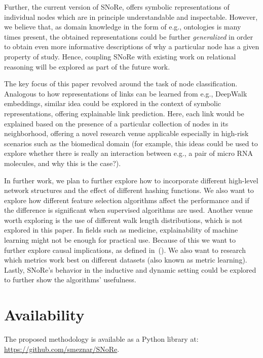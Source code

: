 \documentclass[twoside,11pt]{article}
\begin{document}
Further, the current version of SNoRe, offers symbolic representations of individual nodes which are in principle understandable and inspectable. However, we believe that, as domain knowledge in the form of e.g., ontologies is many times present, the obtained representations could be further \emph{generalized} in order to obtain even more informative descriptions of why a particular node has a given property of study. Hence, coupling SNoRe with existing work on relational reasoning will be explored as part of the future work.

The key focus of this paper revolved around the task of node classification. Analogous to how representations of links can be learned from e.g., DeepWalk embeddings, similar idea could be explored in the context of symbolic representations, offering explainable link prediction. Here, each link would be explained based on the presence of a particular collection of nodes in its neighborhood, offering a novel research venue applicable especially in high-risk scenarios such as the biomedical domain (for example, this ideas could be used to explore whether there is really an interaction between e.g., a pair of micro RNA molecules, and why this is the case?).

In further work, we plan to further explore how to incorporate different high-level network structures and the effect of different hashing functions. We also want to explore how different feature selection algorithms affect the performance and if the difference is significant when supervised algorithms are used. Another venue worth exploring is the use of different walk length distributions, which is not explored in this paper. In fields such as medicine, explainability of machine learning might not be enough for practical use. Because of this we want to further explore causal implications, as defined in~(\cite{Holzinger2019Causability}). We also want to research which metrics work best on different datasets (also known as metric learning). Lastly, SNoRe's behavior in the inductive and dynamic setting could be explored to further show the algorithms' usefulness.

\section*{Availability}
\label{sec:availability}
The proposed methodology is available as a Python library at: \url{https://github.com/smeznar/SNoRe}.

{}

\end{document}
